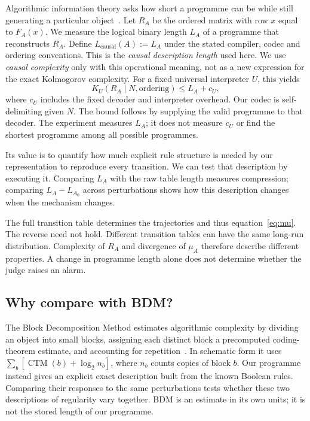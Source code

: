 \documentclass[11pt,a4paper]{article}
\newcommand{\CDL}{L_{\mathrm{causal}}}
\begin{document}
Algorithmic information theory asks how short a programme can be while
still generating a particular object~\cite{kolmogorov}. Let $R_A$ be the
ordered matrix with row $x$ equal to $F_A(x)$. We measure the logical binary
length $L_A$ of a programme that reconstructs $R_A$. Define
$\CDL(A):=L_A$ under the stated compiler, codec and ordering conventions.
This is the \emph{causal description length} used here. We use \emph{causal
complexity} only with this operational meaning, not as a new expression
for the exact Kolmogorov complexity. For a fixed universal
interpreter $U$, this yields
\begin{equation}\label{eq:kolmogorov}
 K_U(R_A\mid N,\text{ordering})\leq L_A+c_U,
\end{equation}
where $c_U$ includes the fixed decoder and interpreter overhead. Our codec
is self-delimiting given $N$. The bound follows by supplying the valid
programme to that decoder. The experiment measures $L_A$; it does not
measure $c_U$ or find the shortest programme among all possible programmes.

Its value is to quantify how much explicit rule structure is needed by
our representation to reproduce every transition. We can test that
description by executing it. Comparing $L_A$ with the raw table length
measures compression; comparing $L_A-L_{A_0}$ across perturbations shows
how this description changes when the mechanism changes.

The full transition table determines the trajectories and thus
equation~\eqref{eq:mu}. The reverse need not hold. Different transition
tables can have the same long-run distribution. Complexity of $R_A$ and
divergence of $\mu_A$ therefore describe different properties. A change in
programme length alone does not determine whether the judge raises an alarm.

\subsection{Why compare with BDM?}
The Block Decomposition Method estimates algorithmic complexity by dividing
an object into small blocks, assigning each distinct block a precomputed
coding-theorem estimate, and accounting for repetition~\cite{bdm,pybdm}.
In schematic form it uses $\sum_b[\operatorname{CTM}(b)+\log_2 n_b]$,
where $n_b$ counts copies of block $b$. Our programme instead gives an
explicit exact description built from the known Boolean rules. Comparing
their responses to the same perturbations tests whether these two
descriptions of regularity vary together. BDM is an estimate in its own
units; it is not the stored length of our programme.
\end{document}
